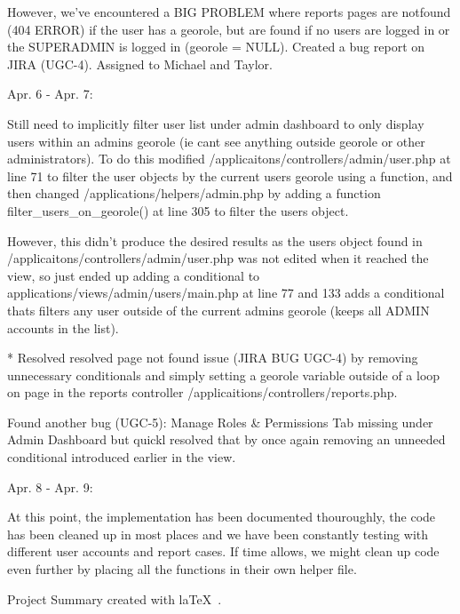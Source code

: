 \documentclass{article}
\begin{document}
    However, we've encountered a BIG PROBLEM where reports pages are notfound (404 ERROR) if the user has a georole, but are found if no users are logged in or the SUPERADMIN is logged in (georole = NULL). Created a bug report on JIRA (UGC-4). Assigned to Michael and Taylor.
        
Apr. 6 - Apr. 7:

    Still need to implicitly filter user list under admin dashboard to only display users within an admins georole (ie cant see anything outside georole or other administrators).  To do this modified /applicaitons/controllers/admin/user.php at line 71 to filter the user objects by the current users georole using a function, and then changed /applications/helpers/admin.php by adding a function filter_users_on_georole() at line 305 to filter the users object.
    
    However, this didn't produce the desired results as the users object found in /applicaitons/controllers/admin/user.php was not edited when it reached the view, so just ended up adding a conditional to applications/views/admin/users/main.php at line 77 and 133 adds a conditional thats filters any user outside of the current admins georole (keeps all ADMIN accounts in the list).
                
                
    * Resolved resolved page not found issue (JIRA BUG UGC-4) by removing unnecessary conditionals and simply setting a georole variable outside of a loop on page in the reports controller /applicaitions/controllers/reports.php.
      
    Found another bug (UGC-5): Manage Roles & Permissions Tab missing under Admin Dashboard but quickl resolved that by once again removing an unneeded conditional introduced earlier in the view.
            
Apr. 8 - Apr. 9:

    At this point, the implementation has been documented thouroughly, the code has been cleaned up in most places and we have been constantly testing with different user accounts and report cases.  If time allows, we might clean up code even further by placing all the functions in their own helper file.        
 
\vfill
\begin{center}
Project Summary created with la\TeX~.
\end{center}
\end{document}
